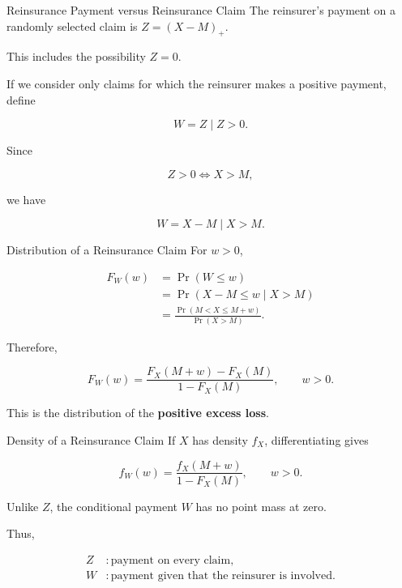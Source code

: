 \documentclass[
  ignorenonframetext,
  aspectratio=169,
]{beamer}
\begin{document}
\begin{frame}{Reinsurance Payment versus Reinsurance Claim}
\protect{}\label{reinsurance-payment-versus-reinsurance-claim}
The reinsurer's payment on a randomly selected claim is \(Z=(X-M)_+.\)

This includes the possibility \(Z=0.\)

If we consider only claims for which the reinsurer makes a positive
payment, define

\[
W=Z\mid Z>0.
\]

Since

\[
Z>0
\iff
X>M,
\]

we have

\[
\boxed{
W=X-M\mid X>M.
}
\]
\end{frame}

\begin{frame}{Distribution of a Reinsurance Claim}
\protect{}\label{distribution-of-a-reinsurance-claim}
For \(w>0\),

\[
\begin{aligned}
F_W(w)
&=\Pr(W\leq w)\\
&=\Pr(X-M\leq w\mid X>M)\\
&=\frac{\Pr(M<X\leq M+w)}
        {\Pr(X>M)}.
\end{aligned}
\]

Therefore,

\[
\boxed{
F_W(w)
=
\frac{F_X(M+w)-F_X(M)}
{1-F_X(M)},
\qquad w>0.
}
\]

This is the distribution of the \textbf{positive excess loss}.
\end{frame}

\begin{frame}{Density of a Reinsurance Claim}
\protect{}\label{density-of-a-reinsurance-claim}
If \(X\) has density \(f_X\), differentiating gives

\[
\boxed{
f_W(w)
=
\frac{f_X(M+w)}
{1-F_X(M)},
\qquad w>0.
}
\]

Unlike \(Z\), the conditional payment \(W\) has no point mass at zero.

Thus,

\[
\begin{aligned}
Z &: \text{payment on every claim},\\
W &: \text{payment given that the reinsurer is involved}.
\end{aligned}
\]
\end{frame}
\end{document}
